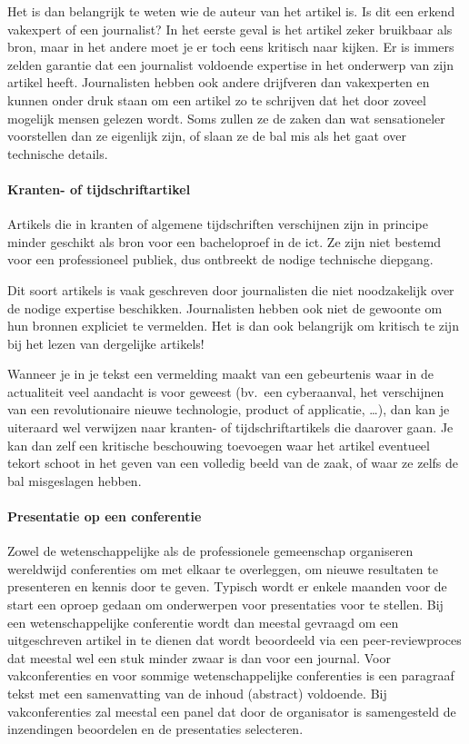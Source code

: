 Het is dan belangrijk te weten wie de auteur van het artikel is. Is dit een erkend vakexpert of een journalist? In het eerste geval is het artikel zeker bruikbaar als bron, maar in het andere moet je er toch eens kritisch naar kijken. Er is immers zelden garantie dat een journalist voldoende expertise in het onderwerp van zijn artikel heeft. Journalisten hebben ook andere drijfveren dan vakexperten en kunnen onder druk staan om een artikel zo te schrijven dat het door zoveel mogelijk mensen gelezen wordt. Soms zullen ze de zaken dan wat sensationeler voorstellen dan ze eigenlijk zijn, of slaan ze de bal mis als het gaat over technische details.

\paragraph{Kranten- of tijdschriftartikel}

Artikels die in kranten of algemene tijdschriften verschijnen zijn in principe minder geschikt als bron voor een bacheloproef in de ict. Ze zijn niet bestemd voor een professioneel publiek, dus ontbreekt de nodige technische diepgang. 

Dit soort artikels is vaak geschreven door journalisten die niet noodzakelijk over de nodige expertise beschikken. Journalisten hebben ook niet de gewoonte om hun bronnen expliciet te vermelden. Het is dan ook belangrijk om kritisch te zijn bij het lezen van dergelijke artikels!

Wanneer je in je tekst een vermelding maakt van een gebeurtenis waar in de actualiteit veel aandacht is voor geweest (bv.\ een cyberaanval, het verschijnen van een revolutionaire nieuwe technologie, product of applicatie, \ldots), dan kan je uiteraard wel verwijzen naar kranten- of tijdschriftartikels die daarover gaan. Je kan dan zelf een kritische beschouwing toevoegen waar het artikel eventueel tekort schoot in het geven van een volledig beeld van de zaak, of waar ze zelfs de bal misgeslagen hebben.

\paragraph{Presentatie op een conferentie}

Zowel de wetenschappelijke als de professionele gemeenschap organiseren wereldwijd conferenties om met elkaar te overleggen, om nieuwe resultaten te presenteren en kennis door te geven. Typisch wordt er enkele maanden voor de start een oproep gedaan om onderwerpen voor presentaties voor te stellen. Bij een wetenschappelijke conferentie wordt dan meestal gevraagd om een uitgeschreven artikel in te dienen dat wordt beoordeeld via een peer-reviewproces dat meestal wel een stuk minder zwaar is dan voor een journal. Voor vakconferenties en voor sommige wetenschappelijke conferenties is een paragraaf tekst met een samenvatting van de inhoud (abstract) voldoende. Bij vakconferenties zal meestal een panel dat door de organisator is samengesteld de inzendingen beoordelen en de presentaties selecteren.

